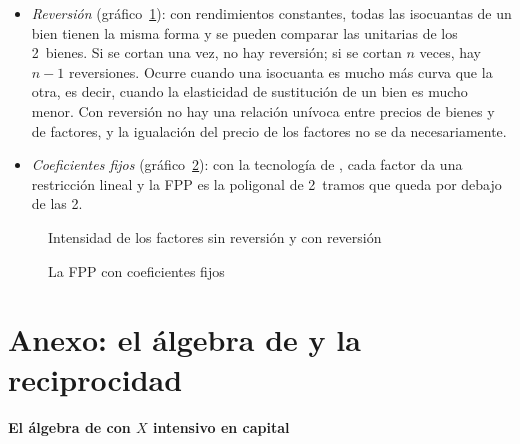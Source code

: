 \documentclass[11pt]{article}
\begin{document}
\begin{itemize}
\item \emph{Reversión} (gráfico~\ref{fig:reversion-intensidades}): con rendimientos constantes, todas las isocuantas de un bien tienen la misma forma y se pueden comparar las unitarias de los 2~bienes. Si se cortan una vez, no hay reversión; si se cortan $n$ veces, hay $n-1$ reversiones. Ocurre cuando una isocuanta es mucho más curva que la otra, es decir, cuando la elasticidad de sustitución de un bien es mucho menor\nocite{Minhas1962Homohypallagic}. Con reversión no hay una relación unívoca entre precios de bienes y de factores, y la igualación del precio de los factores no se da necesariamente.
\item \emph{Coeficientes fijos} (gráfico~\ref{fig:fpp-coeficientes-fijos}): con la tecnología de  , cada factor da una restricción lineal y la FPP es la poligonal de 2~tramos que queda por debajo de las 2\nocite{KrugmanObstfeldMelitz2018International}.
\end{itemize}
\begin{figure}[H]
\centering
\caption{Intensidad de los factores sin reversión y con reversión}\label{fig:reversion-intensidades}
\end{figure}
\begin{figure}[H]
\centering
\caption{La FPP con coeficientes fijos}\label{fig:fpp-coeficientes-fijos}
\end{figure}

\section{Anexo: el álgebra de  y la reciprocidad}\label{anexo:rybczynski}


\paragraph{El álgebra de  con $X$ intensivo en capital}
\end{document}
